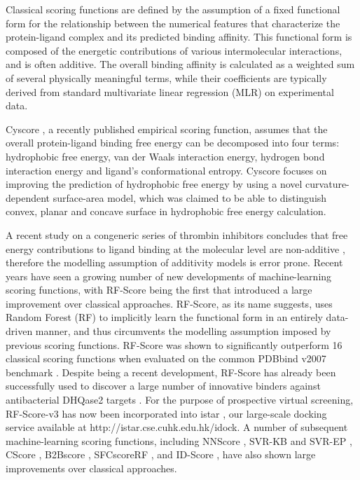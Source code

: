\documentclass[linenumbers]{bmcart}
\begin{document}
Classical scoring functions are defined by the assumption of a fixed functional form for the relationship between the numerical features that characterize the protein-ligand complex and its predicted binding affinity. This functional form is composed of the energetic contributions of various intermolecular interactions, and is often additive. The overall binding affinity is calculated as a weighted sum of several physically meaningful terms, while their coefficients are typically derived from standard multivariate linear regression (MLR) on experimental data.

Cyscore \cite{1372}, a recently published empirical scoring function, assumes that the overall protein-ligand binding free energy can be decomposed into four terms: hydrophobic free energy, van der Waals interaction energy, hydrogen bond interaction energy and ligand's conformational entropy. Cyscore focuses on improving the prediction of hydrophobic free energy by using a novel curvature-dependent surface-area model, which was claimed to be able to distinguish convex, planar and concave surface in hydrophobic free energy calculation.

A recent study on a congeneric series of thrombin inhibitors concludes that free energy contributions to ligand binding at the molecular level are non-additive \cite{1416}, therefore the modelling assumption of additivity models is error prone. Recent years have seen a growing number of new developments of machine-learning scoring functions, with RF-Score \cite{564} being the first that introduced a large improvement over classical approaches. RF-Score, as its name suggests, uses Random Forest (RF) \cite{1309} to implicitly learn the functional form in an entirely data-driven manner, and thus circumvents the modelling assumption imposed by previous scoring functions. RF-Score was shown to significantly outperform 16 classical scoring functions when evaluated on the common PDBbind v2007 benchmark \cite{564}. Despite being a recent development, RF-Score has already been successfully used to discover a large number of innovative binders against antibacterial DHQase2 targets \cite{1281}. For the purpose of prospective virtual screening, RF-Score-v3 has now been incorporated into istar \cite{1362}, our large-scale docking service available at http://istar.cse.cuhk.edu.hk/idock. A number of subsequent machine-learning scoring functions, including NNScore \cite{977}, SVR-KB and SVR-EP \cite{963}, CScore \cite{1194}, B2Bscore \cite{1410}, SFCscoreRF \cite{1347}, and ID-Score \cite{1305}, have also shown large improvements over classical approaches.
\end{document}
